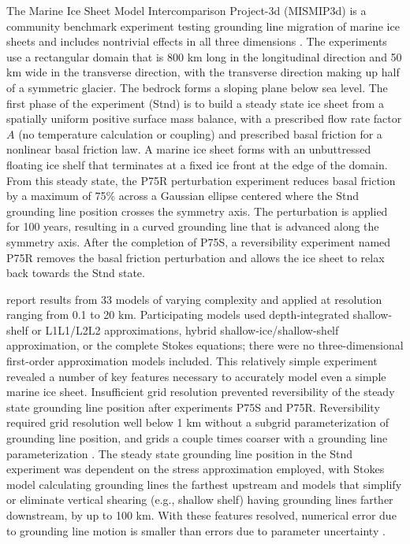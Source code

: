 The Marine Ice Sheet Model Intercomparison Project-3d (MISMIP3d) is a community benchmark experiment
testing grounding line migration of marine ice sheets and includes nontrivial effects in all three dimensions \citep{pattyn2013}.
The experiments use a rectangular domain that is 800 km long in the longitudinal direction and 
50 km wide in the transverse direction, with the transverse direction making up half of a symmetric glacier.
The bedrock forms a sloping plane below sea level.
The first phase of the experiment (Stnd) is to build a steady state ice sheet
from a spatially uniform positive surface mass balance,
with a prescribed flow rate factor $A$ (no temperature calculation or coupling)
and prescribed basal friction for a nonlinear basal friction law.
A marine ice sheet forms with an unbuttressed floating ice shelf that terminates
at a fixed ice front at the edge of the domain.
From this steady state, the P75R perturbation experiment reduces basal friction by a maximum of 75\%
across a Gaussian ellipse centered where the Stnd grounding line position crosses the symmetry axis.
The perturbation is applied for 100 years, resulting in a curved grounding line that is advanced along the symmetry axis.
After the completion of P75S, a reversibility experiment named P75R removes the basal friction perturbation
and allows the ice sheet to relax back towards the Stnd state.

\citet{pattyn2013} report results from 33 models of varying complexity and applied at resolution ranging from 0.1 to 20 km.
Participating models used depth-integrated shallow-shelf or L1L1/L2L2 approximations, hybrid shallow-ice/shallow-shelf approximation, or the complete Stokes equations; there were no three-dimensional first-order approximation models included.
This relatively simple experiment revealed a number of key features necessary to accurately model even a simple marine ice sheet.
Insufficient grid resolution prevented reversibility of the steady state grounding line position after experiments P75S and P75R.
Reversibility required grid resolution well below 1 km without a subgrid parameterization of grounding line position,
and grids a couple times coarser with a grounding line parameterization \citep{pattyn2013,Gladstone2010a}.
The steady state grounding line position in the Stnd experiment was dependent on the stress approximation employed, 
with Stokes model calculating grounding lines the farthest upstream and models that simplify or eliminate vertical shearing 
(e.g., shallow shelf) having grounding lines farther downstream, by up to 100 km.
With these features resolved, numerical error due to grounding line motion is smaller than errors due to parameter uncertainty \citep{pattyn2013}.

